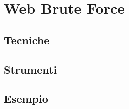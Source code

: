 \chapter{Web Brute Force}
\section{Tecniche}
\section{Strumenti}
\section{Esempio}
\label{chap:conc}
